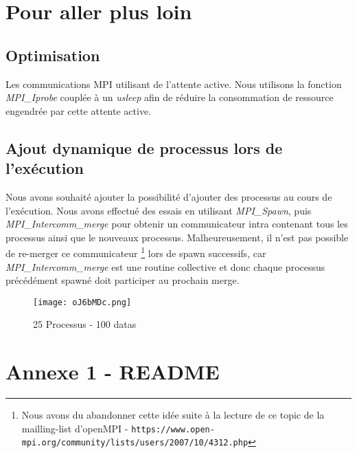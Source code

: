 \documentclass[a4paper, 11pt, french]{article}
\begin{document}
\section{Pour aller plus loin}
\subsection {Optimisation}
Les communications MPI utilisant de l'attente active. Nous utilisons la fonction \textit{MPI\_Iprobe} couplée à un \textit{usleep} afin de réduire la consommation de ressource engendrée par cette attente active.

\subsection {Ajout dynamique de processus lors de l'exécution}
Nous avons souhaité ajouter la possibilité d'ajouter des processus au cours de l'exécution. Nous avons effectué des essais en utilisant \textit{MPI\_Spawn}, puis \textit{MPI\_Intercomm\_merge} pour obtenir un communicateur intra contenant tous les processus ainsi que le nouveaux processus. Malheureusement, il n'est pas possible de re-merger ce communicateur \footnote{Nous avons du abandonner cette idée suite à la lecture de ce topic de la mailling-list d'openMPI - \texttt{https://www.open-mpi.org/community/lists/users/2007/10/4312.php}} lors de spawn successifs, car \textit{MPI\_Intercomm\_merge} est une routine collective et donc chaque processus précédément spawné doit participer au prochain merge.

\begin{figure}[h]
  \centering
      \texttt{[image: oJ6bMDc.png]}
  \caption{25 Processus - 100 datas}
  \label{}
\end{figure}

\newpage
\appendix %
\section{Annexe 1 - README}

\end{document}
